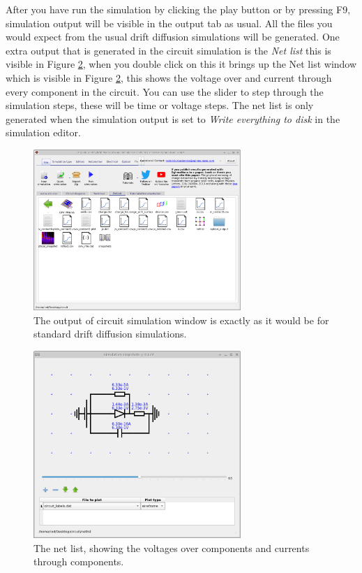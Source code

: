 After you have run the simulation by clicking the play button or by pressing F9, simulation output will be visible in the output tab as usual.  All the files you would expect from the usual drift diffusion simulations will be generated. One extra output that is generated in the circuit simulation is the \emph{Net list} this is visible in Figure \ref{fig:circuit_net_list}, when you double click on this it brings up the Net list window which is visible in Figure \ref{fig:circuit_net_list}, this shows the voltage over and current through every component in the circuit. You can use the slider to step through the simulation steps, these will be time or voltage steps. The net list is only generated when the simulation output is set to \emph{Write everything to disk} in the simulation editor.



\begin{figure}
\centering
\includegraphics[width=0.7\textwidth,height=0.6\textwidth]{./images/circuit/1.png}
\caption{The output of circuit simulation window is exactly as it would be for standard drift diffusion simulations.}
\label{fig:circuit_1}
\end{figure}

\begin{figure}
\centering
\includegraphics[width=0.7\textwidth,height=0.6\textwidth]{./images/circuit/net_list.png}
\caption{The net list, showing the voltages over components and currents through components.}
\label{fig:circuit_net_list}
\end{figure}


